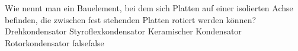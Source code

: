     {Wie nennt man ein Bauelement, bei dem sich Platten auf einer isolierten Achse befinden, die zwischen fest stehenden Platten rotiert werden können?}
    {Drehkondensator}
    {Styroflexkondensator}
    {Keramischer Kondensator}
    {Rotorkondensator}
    {false}{false}